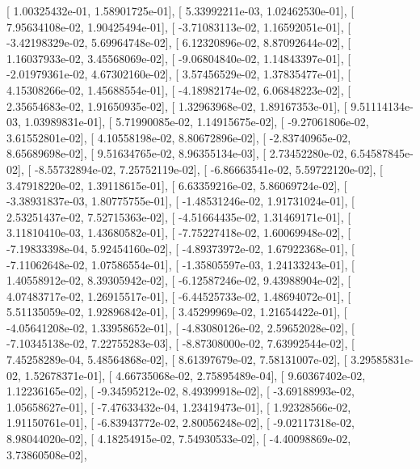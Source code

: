 \documentclass{article}
\begin{document}
       [  1.00325432e-01,   1.58901725e-01],
       [  5.33992211e-03,   1.02462530e-01],
       [  7.95634108e-02,   1.90425494e-01],
       [ -3.71083113e-02,   1.16592051e-01],
       [ -3.42198329e-02,   5.69964748e-02],
       [  6.12320896e-02,   8.87092644e-02],
       [  1.16037933e-02,   3.45568069e-02],
       [ -9.06804840e-02,   1.14843397e-01],
       [ -2.01979361e-02,   4.67302160e-02],
       [  3.57456529e-02,   1.37835477e-01],
       [  4.15308266e-02,   1.45688554e-01],
       [ -4.18982174e-02,   6.06848223e-02],
       [  2.35654683e-02,   1.91650935e-02],
       [  1.32963968e-02,   1.89167353e-01],
       [  9.51114134e-03,   1.03989831e-01],
       [  5.71990085e-02,   1.14915675e-02],
       [ -9.27061806e-02,   3.61552801e-02],
       [  4.10558198e-02,   8.80672896e-02],
       [ -2.83740965e-02,   8.65689698e-02],
       [  9.51634765e-02,   8.96355134e-03],
       [  2.73452280e-02,   6.54587845e-02],
       [ -8.55732894e-02,   7.25752119e-02],
       [ -6.86663541e-02,   5.59722120e-02],
       [  3.47918220e-02,   1.39118615e-01],
       [  6.63359216e-02,   5.86069724e-02],
       [ -3.38931837e-03,   1.80775755e-01],
       [ -1.48531246e-02,   1.91731024e-01],
       [  2.53251437e-02,   7.52715363e-02],
       [ -4.51664435e-02,   1.31469171e-01],
       [  3.11810410e-03,   1.43680582e-01],
       [ -7.75227418e-02,   1.60069948e-02],
       [ -7.19833398e-04,   5.92454160e-02],
       [ -4.89373972e-02,   1.67922368e-01],
       [ -7.11062648e-02,   1.07586554e-01],
       [ -1.35805597e-03,   1.24133243e-01],
       [  1.40558912e-02,   8.39305942e-02],
       [ -6.12587246e-02,   9.43988904e-02],
       [  4.07483717e-02,   1.26915517e-01],
       [ -6.44525733e-02,   1.48694072e-01],
       [  5.51135059e-02,   1.92896842e-01],
       [  3.45299969e-02,   1.21654422e-01],
       [ -4.05641208e-02,   1.33958652e-01],
       [ -4.83080126e-02,   2.59652028e-02],
       [ -7.10345138e-02,   7.22755283e-03],
       [ -8.87308000e-02,   7.63992544e-02],
       [  7.45258289e-04,   5.48564868e-02],
       [  8.61397679e-02,   7.58131007e-02],
       [  3.29585831e-02,   1.52678371e-01],
       [  4.66735068e-02,   2.75895489e-04],
       [  9.60367402e-02,   1.12236165e-02],
       [ -9.34595212e-02,   8.49399918e-02],
       [ -3.69188993e-02,   1.05658627e-01],
       [ -7.47633432e-04,   1.23419473e-01],
       [  1.92328566e-02,   1.91150761e-01],
       [ -6.83943772e-02,   2.80056248e-02],
       [ -9.02117318e-02,   8.98044020e-02],
       [  4.18254915e-02,   7.54930533e-02],
       [ -4.40098869e-02,   3.73860508e-02],
\end{document}
